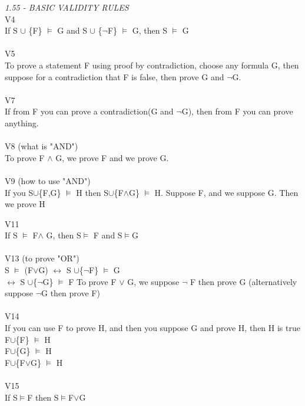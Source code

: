 \documentclass[10pt,letter]{article}
\begin{document}
\textit{1.55 - BASIC VALIDITY RULES}\\
V4\\
If S $\cup$ \{F\} $\models$ G and S $\cup$ \{$\neg$F\} $\models$ G, then S $\models$ G
\\\\
V5\\
To prove a statement F using proof by contradiction, choose any formula G, then suppose for a contradiction that F is false, then prove G and $\neg$G.\\\\
V7\\
If from F you can prove a contradiction(G and $\neg$G), then from F you can prove anything.\\\\

V8 (what is "AND")\\
To prove F $\wedge$ G, we prove F and we prove G.\\\\

V9 (how to use "AND")\\
If you S$\cup$\{F,G\} $\models$ H then S$\cup$\{F$\wedge$G\} $\models$ H.
Suppose F, and we suppose G. Then we prove H

V11\\
If S $\models$ F$\wedge$ G, then S$\models$ F and S$\models$G\\\\

V13 (to prove "OR")\\ 
S $\models$ (F$\vee$G) $\longleftrightarrow$ S $\cup$\{$\neg$F\} $\models$ G\\
                        $\longleftrightarrow$ S $\cup$\{$\neg$G\} $\models$ F
To prove F $\vee$ G, we suppose $\neg$ F then prove G (alternatively suppose $\neg$G then prove F)\\\\

V14\\
If you can use F to prove H, and then you suppose G and prove H, then H is true\\
F$\cup$\{F\} $\models$ H\\
F$\cup$\{G\} $\models$ H\\
F$\cup$\{F$\vee$G\} $\models$ H\\\\

V15\\
If S$\models$F then S$\models$F$\vee$G\\\\
\end{document}
